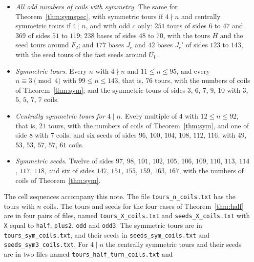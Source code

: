 \documentclass[11pt]{amsart}
\theoremstyle{remark}
\begin{document}
\begin{itemize}
$N_0\not\equiv3\pmod 4$: a base with $c$ coils for every $c$ from $L(N_0)$ to $M(N_0)-1$, that is, $499$ bases
in all; the tour $H$ of side $N_0+24$; and the seed tour of side $N_0+48$ of the seed around $F_2$. For
$N_0=123,127,\dots,143$: a base $J_c$ for every $c$ from $L(N_0)+1$ to $M(N_0)-4$ and a base $J_c'$ for every $c$
from $M(N_0)-15$ to $M(N_0)-1$, that is, $451$ bases in all; and the seed tour of side $N_0+48$ of the fast
seed around $U_1$ (Section~\ref{sec:spec}).
\item \emph{All odd numbers of coils with symmetry.} The same for Theorem~\ref{thm:symspec}, with symmetric tours
if $4\nmid n$ and centrally symmetric tours if $4\mid n$, and with odd $c$ only: $251$ tours of sides $6$ to $47$ and
$369$ of sides $51$ to $119$; $238$ bases of sides $48$ to $70$, with the tours $H$ and the seed tours around $F_2$;
and $177$ bases $J_c$ and $42$ bases $J_c'$ of sides $123$ to $143$, with the seed tours of the fast seeds around
$U_1$.
\item \emph{Symmetric tours.} Every $n$ with $4\nmid n$ and $11\le n\le95$, and every $n\equiv3\pmod 4$ with
$99\le n\le143$, that is, $76$ tours, with the numbers of coils of Theorem~\ref{thm:sym}; and the symmetric tours
of sides $3$, $6$, $7$, $9$, $10$ with $3$, $5$, $5$, $7$, $7$ coils.
\item \emph{Centrally symmetric tours for $4\mid n$.} Every multiple of $4$ with $12\le n\le92$, that is, $21$
tours, with the numbers of coils of Theorem~\ref{thm:sym}, and one of side $8$ with $7$ coils; and six seeds of sides
$96$, $100$, $104$, $108$, $112$, $116$, with $49$, $53$, $53$, $57$, $57$, $61$ coils.
\item \emph{Symmetric seeds.} Twelve of sides $97$, $98$, $101$, $102$, $105$, $106$, $109$, $110$, $113$, $114$,
$117$, $118$, and six of sides $147$, $151$, $155$, $159$, $163$, $167$, with the numbers of coils of
Theorem~\ref{thm:sym}.
\end{itemize}
The cell sequences accompany this note. The file \texttt{tours\_n\_coils.txt} has the tours with $n$ coils. The
tours and seeds for the four cases of Theorem~\ref{thm:half} are in four pairs of files, named
\texttt{tours\_X\_coils.txt} and \texttt{seeds\_X\_coils.txt} with \texttt{X} equal to \texttt{half},
\texttt{plus2}, \texttt{odd} and \texttt{odd3}. The symmetric tours are in \texttt{tours\_sym\_coils.txt}, and
their seeds in \texttt{seeds\_sym\_coils.txt} and \texttt{seeds\_sym3\_coils.txt}. For $4\mid n$ the centrally
symmetric tours and their seeds are in two files named \texttt{tours\_half\_turn\_coils.txt} and
\end{document}
